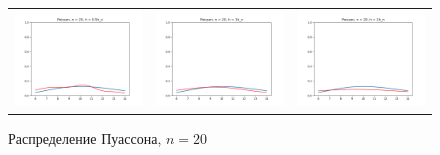 	
	\begin{figure}[H]
		\centering
		\begin{tabular}{ccc}
			\includegraphics[width=55mm, height =0.25\textheight]{pics/ker_p_20_1.png}
			&
			\includegraphics[width=55mm, height =0.25\textheight]{pics/ker_p_20_2.png}
			&
			\includegraphics[width=55mm, height =0.25\textheight]{pics/ker_p_20_3.png}
		\end{tabular}
		\caption{Распределение Пуассона, $n = 20$}
		\label{fig:poisson}
	\end{figure}

